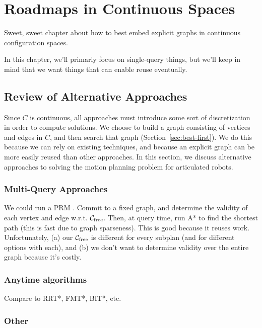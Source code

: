 \chapter{Roadmaps in Continuous Spaces}
\label{chap:graphs-in-continuous}

Sweet, sweet chapter about how to best embed explicit graphs
in continuous configuration spaces.

In this chapter,
we'll primarly focus on single-query things,
but we'll keep in mind that we want things that can enable reuse eventually.

\section{Review of Alternative Approaches}
\label{sec:related-work}

Since $C$ is continuous,
all approaches must introduce some sort of discretization
in order to compute solutions.
We choose to build a graph consisting of vertices and edges in $C$,
and then search that graph (Section~\ref{sec:best-first}).
We do this because we can rely on existing techniques,
and because an explicit graph can be more easily reused than other
approaches.
In this section, we discuss alternative approaches to solving
the motion planning problem for articulated robots.

\subsection{Multi-Query Approaches}

We could run a PRM \cite{kavrakietal1996prm}.
Commit to a fixed graph,
and determine the validity of each vertex and edge w.r.t.
$\mathcal{C}_{\mbox{\scriptsize free}}$.
Then, at query time,
run A* to find the shortest path (this is fast due to graph sparseness).
This is good because it reuses work.
Unfortunately,
(a) our $\mathcal{C}_{\mbox{\scriptsize free}}$
is different for every subplan
(and for different options with each),
and (b) we don't want to determine validity over the entire graph
because it's costly.

\subsection{Anytime algorithms}

Compare to RRT*, FMT*, BIT*, etc.

\subsection{Other}

